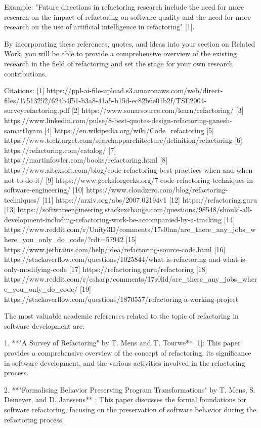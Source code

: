 Example:
"Future directions in refactoring research include the need for more research on the impact of refactoring on software quality and the need for more research on the use of artificial intelligence in refactoring" [1].

By incorporating these references, quotes, and ideas into your section on Related Work, you will be able to provide a comprehensive overview of the existing research in the field of refactoring and set the stage for your own research contributions.

Citations:
[1] https://ppl-ai-file-upload.s3.amazonaws.com/web/direct-files/17513252/624b4f51-b3a8-41a5-b15d-ec82b6e01b2f/TSE2004-surveyrefactoring.pdf
[2] https://www.sonarsource.com/learn/refactoring/
[3] https://www.linkedin.com/pulse/8-best-quotes-design-refactoring-ganesh-samarthyam
[4] https://en.wikipedia.org/wiki/Code_refactoring
[5] https://www.techtarget.com/searchapparchitecture/definition/refactoring
[6] https://refactoring.com/catalog/
[7] https://martinfowler.com/books/refactoring.html
[8] https://www.altexsoft.com/blog/code-refactoring-best-practices-when-and-when-not-to-do-it/
[9] https://www.geeksforgeeks.org/7-code-refactoring-techniques-in-software-engineering/
[10] https://www.cloudzero.com/blog/refactoring-techniques/
[11] https://arxiv.org/abs/2007.02194v1
[12] https://refactoring.guru
[13] https://softwareengineering.stackexchange.com/questions/98548/should-all-development-including-refactoring-work-be-accompanied-by-a-tracking
[14] https://www.reddit.com/r/Unity3D/comments/17s0lnn/are_there_any_jobs_where_you_only_do_code/?rdt=57942
[15] https://www.jetbrains.com/help/idea/refactoring-source-code.html
[16] https://stackoverflow.com/questions/1025844/what-is-refactoring-and-what-is-only-modifying-code
[17] https://refactoring.guru/refactoring
[18] https://www.reddit.com/r/csharp/comments/17s0lid/are_there_any_jobs_where_you_only_do_code/
[19] https://stackoverflow.com/questions/1870557/refactoring-a-working-project

The most valuable academic references related to the topic of refactoring in software development are:

1. **"A Survey of Refactoring" by T. Mens and T. Tourwe** [1]: This paper provides a comprehensive overview of the concept of refactoring, its significance in software development, and the various activities involved in the refactoring process.

2. **"Formalising Behavior Preserving Program Transformations" by T. Mens, S. Demeyer, and D. Janssens** : This paper discusses the formal foundations for software refactoring, focusing on the preservation of software behavior during the refactoring process.

